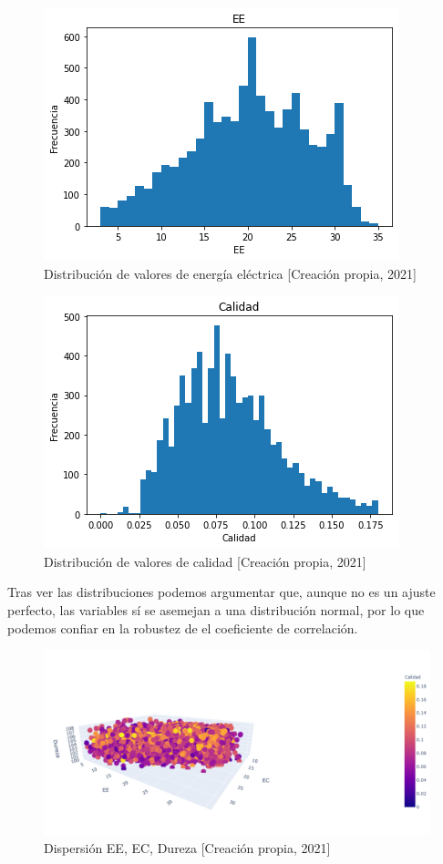 \documentclass{article}
\begin{document}
\begin{figure}[H]
    \centering
    \includegraphics[scale=.7]{histogramas/img6.png}
    \caption{Distribución de valores de energía eléctrica [Creación propia, 2021]}
    \label{fig:ec}
\end{figure}

\begin{figure}[H]
    \centering
    \includegraphics[scale=.7]{histogramas/img7.png}
    \caption{Distribución de valores de calidad [Creación propia, 2021]}
    \label{fig:calidad}
\end{figure}


Tras ver las distribuciones podemos argumentar que, aunque no es un ajuste perfecto, las variables sí se asemejan a una distribución normal, por lo que podemos confiar en la robustez de el coeficiente de correlación. 


\begin{figure}[H]
    \centering
    \includegraphics[scale=.5]{img9.png}
    \caption{Dispersión EE, EC, Dureza [Creación propia, 2021]}
    \label{fig:3d}
\end{figure}
\end{document}

